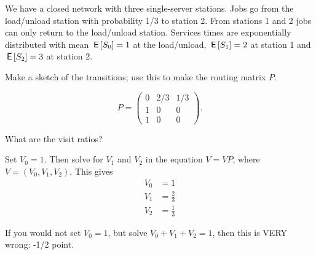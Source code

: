 We have a closed network with three single-server stations. Jobs go from the load/unload station with probability 1/3 to  station 2. From stations 1 and 2 jobs can only return to the load/unload station. Services times are exponentially distributed with mean $\,\mathsf{E}\left[S_0\right] = 1$ at the load/unload, $\,\mathsf{E}\left[S_1\right] = 2$ at station 1 and $\,\mathsf{E}\left[S_2\right]=3$ at station 2.

\begin{exercise}[201807]{1}
Make a sketch of the transitions; use this to make the routing matrix $P$.
\begin{solution}
  \begin{equation*}
  P=
  \begin{pmatrix}
    0 & 2/3 & 1/3 \\
1 & 0 & 0 \\
1 & 0 & 0
  \end{pmatrix}.
  \end{equation*}



\end{solution}
\end{exercise}

\begin{exercise}[201807]{1}
  What are the visit ratios?
\begin{solution}
Set $V_0=1$. Then solve for $V_1$ and $V_2$ in the equation $V = VP$, where $V=(V_0, V_1, V_2)$.
This gives
\begin{align*}
V_0&= 1\\
V_1&= \frac{2}{3}\\
V_2&= \frac{1}{3}
\end{align*}

If you would not set $V_0=1$, but solve $V_0+V_1+V_2 = 1$, then this is VERY wrong: -1/2 point.
\end{solution}
\end{exercise}

